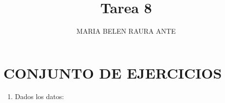 \documentclass[
  letterpaper,
  DIV=11,
  numbers=noendperiod]{scrartcl}
\title{Tarea 8}
\author{MARIA BELEN RAURA ANTE}
\date{}
\providecommand{\tightlist}{%
  \setlength{\itemsep}{0pt}\setlength{\parskip}{0pt}}\usepackage{longtable,booktabs,array}
\renewcommand*\contentsname{Tabla de contenidos}
\newcommand\contentsname{Tabla de contenidos}
\begin{document}
\maketitle

\renewcommand*\contentsname{Tabla de Contenidos}
{
\hypersetup{linkcolor=}
\setcounter{tocdepth}{3}
\tableofcontents
}

\section{CONJUNTO DE EJERCICIOS}\label{conjunto-de-ejercicios}

\begin{enumerate}
\def\labelenumi{\arabic{enumi}.}
\tightlist
\item
  Dados los datos:
\end{enumerate}
\end{document}
